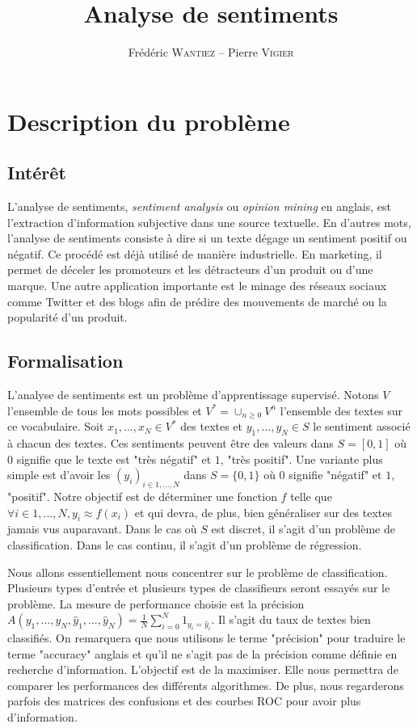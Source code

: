 \documentclass{article}
\title{Analyse de sentiments}
\author{Frédéric \textsc{Wantiez} -- Pierre \textsc{Vigier}}
\begin{document}
\maketitle

\section{Description du problème}

\subsection{Intérêt}

L'analyse de sentiments, \textit{sentiment analysis} ou \textit{opinion mining} en anglais, est l'extraction d'information subjective dans une source textuelle. En d'autres mots, l'analyse de sentiments consiste à dire si un texte dégage un sentiment positif ou négatif. Ce procédé est déjà utilisé de manière industrielle. En marketing, il permet de déceler les promoteurs et les détracteurs d'un produit ou d'une marque. Une autre application importante est le minage des réseaux sociaux comme Twitter et des blogs afin de prédire des mouvements de marché ou la popularité d'un produit.

\subsection{Formalisation}

L'analyse de sentiments est un problème d'apprentissage supervisé. Notons $V$ l'ensemble de tous les mots possibles et $V^{*}=\cup_{n \geq 0}{V^{n}}$ l'ensemble des textes sur ce vocabulaire. Soit $x_{1}, ..., x_{N} \in V^{*}$ des textes et $y_{1}, ..., y_{N} \in S$ le sentiment associé à chacun des textes. Ces sentiments peuvent être des valeurs dans $S=[0, 1]$ où $0$ signifie que le texte est "très négatif" et $1$, "très positif". Une variante plus simple est d'avoir les $(y_{i})_{i \in {1, ..., N}}$ dans $S=\{0, 1\}$ où 0 signifie "négatif" et $1$, "positif". Notre objectif est de déterminer une fonction $f$ telle que $\forall i \in {1, ..., N}, y_{i} \approx f(x_{i})$ et qui devra, de plus, bien généraliser sur des textes jamais vus auparavant. Dans le cas où $S$ est discret, il s'agit d'un problème de classification. Dans le cas continu, il s'agit d'un problème de régression.

Nous allons essentiellement nous concentrer sur le problème de classification. Plusieurs types d'entrée et plusieurs types de classifieurs seront essayés sur le problème. La mesure de performance choisie est la précision $A(y_{1}, ..., y_{N}, \hat{y}_{1}, ..., \hat{y}_{N}) = \frac{1}{N}\sum_{i=0}^{N}{1_{y_{i}=\hat{y}_{i}}}$. Il s'agit du taux de textes bien classifiés. On remarquera que nous utilisons le terme "précision" pour traduire le terme "accuracy" anglais et qu'il ne s'agit pas de la précision comme définie en recherche d'information. L'objectif est de la maximiser. Elle nous permettra de comparer les performances des différents algorithmes. De plus, nous regarderons parfois des matrices des confusions et des courbes ROC pour avoir plus d'information.
\end{document}
